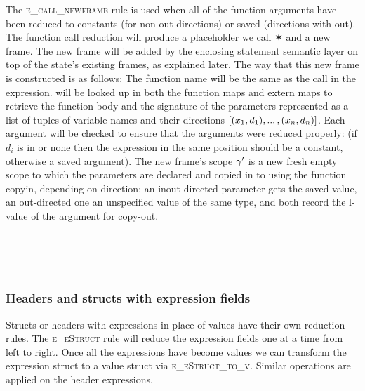 \documentclass[UTF8]{article}
\begin{document}
The \textsc{e\_call\_newframe} rule is used when all of the function arguments have been reduced to constants (for non-out directions) or saved (directions with out). The function call reduction will produce a placeholder we call $\varstar$ and a new frame. The new frame will be added by the enclosing statement semantic layer on top of the state's existing frames, as explained later.
The way that this new frame is constructed is as follows: The function name \funn{} will be the same as the call in the expression. \funn{} will be looked up in both the function maps and extern maps to retrieve the function body \stmt{} and the signature of the parameters represented as a list of tuples of variable names and their directions $ [(x{}_1, d_1) , ... \, , (x{}_n, d_n) ] $. Each argument will be checked to ensure that the arguments were reduced properly: (if $d_i$ is in or none then the expression in the same position should be a constant, otherwise a saved argument). The new frame's scope $\gamma'$ is a new fresh empty scope to which the parameters are declared and copied in to using the function $\mathrm{copyin}$, depending on direction: an inout-directed parameter gets the saved value, an out-directed one an unspecified value of the same type, and both record the l-value of the argument for copy-out.

\begin{figure}[ht!]
    \ottusedrule{\ottdruleeXXcallXXargs{}} \\
    \ottusedrule{\ottdruleeXXcallXXsave{}} \\
    \ottusedrule{\ottdruleeXXcallXXnewframe{}} \\
    \ottusedrule{\ottdruleeXXsavedXXv{}}
\end{figure}


\subsubsection*{Headers and structs with expression fields}
Structs or headers with expressions in place of values have their own reduction rules. The \textsc{e\_eStruct} rule will reduce the expression fields one at a time from left to right. Once all the expressions have become values we can transform the expression struct to a value struct via \textsc{e\_eStruct\_to\_v}. Similar operations are applied on the header expressions.

\begin{figure}[ht!]
    \ottusedrule{\ottdruleeXXeStruct{}} \\
    \ottusedrule{\ottdruleeXXeStructXXtoXXv{}} \\
    \ottusedrule{\ottdruleeXXeHeader{}} \\
    \ottusedrule{\ottdruleeXXeHeaderXXtoXXv{}}
\end{figure}
\end{document}
